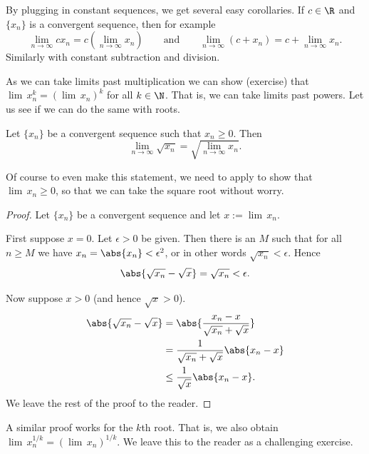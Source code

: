 \documentclass[12pt]{book}
\begin{document}
By plugging in constant sequences, we get several easy corollaries.
If $c \in \R$ and $\{ x_n \}$ is a convergent sequence, then
for example
\begin{equation*}
\lim_{n \to \infty} c x_n = 
c \left( \lim_{n \to \infty} x_n \right) \qquad
\text{and}
\qquad
\lim_{n \to \infty} (c + x_n) = 
c + \lim_{n \to \infty} x_n .
\end{equation*}
Similarly with constant subtraction and division.

As we can take limits past multiplication we can show (exercise)
that $\lim\, x_n^k = {(\lim\, x_n)}^k$ for all $k \in \N$.
That is, we can take limits
past powers.
Let us see if we can do the same with roots.

\begin{prop}
Let $\{ x_n \}$ be a convergent sequence such
that $x_n \geq 0$.
Then
\begin{equation*}
\lim_{n\to\infty} \sqrt{x_n} =
\sqrt{ \lim_{n\to\infty} x_n } .
\end{equation*}
\end{prop}

Of course to even make this statement, we need to apply
 to show
that
$\lim\, x_n \geq 0$, so that we can take the square root without
worry.

\begin{proof}
Let $\{ x_n \}$ be a convergent sequence and let $x := \lim\, x_n$.

First suppose $x=0$.
Let $\epsilon > 0$ be given.
Then there is an $M$ such that for all $n \geq M$ we have
$x_n = \abs{x_n} < \epsilon^2$, or in other words $\sqrt{x_n} < \epsilon$.
Hence
\begin{equation*}
\abs{\sqrt{x_n} - \sqrt{x}} =
\sqrt{x_n} < \epsilon.
\end{equation*}

Now suppose $x > 0$ (and hence $\sqrt{x} > 0$).
\begin{equation*}
\begin{split}
\abs{\sqrt{x_n}-\sqrt{x}} &= 
\abs{\frac{x_n-x}{\sqrt{x_n}+\sqrt{x}}} \\
&=
\frac{1}{\sqrt{x_n}+\sqrt{x}}
\abs{x_n-x} \\
& \leq
\frac{1}{\sqrt{x}}
\abs{x_n-x} .
\end{split}
\end{equation*}
We leave the rest of the proof to the reader.
\end{proof}

A similar proof works for the $k$th root.
That is, we also
obtain
$\lim\, x_n^{1/k} = {( \lim\, x_n )}^{1/k}$.
We leave this to the reader
as a challenging exercise.
\end{document}
